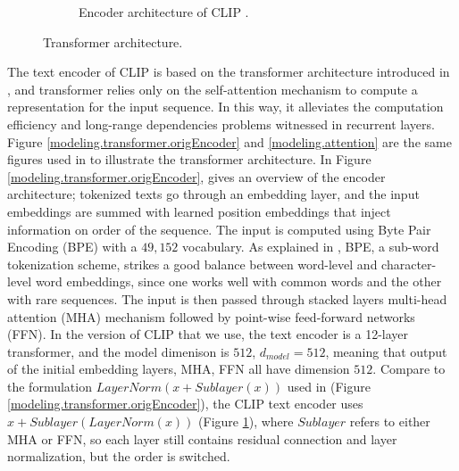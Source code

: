 \begin{figure}[!htb]
\begin{subfigure}{0.5\textwidth}
    \caption{Encoder architecture of CLIP \citep{CLIPpaper}.}
    \label{modeling.attention.clipEncoder}
\end{subfigure}
\caption{Transformer architecture.}
\label{modeling.transformer}
\end{figure}

The text encoder of CLIP is based on the transformer architecture introduced in \citet{attentionAllYouNeed}, and transformer relies only on the self-attention mechanism to compute a representation for the input sequence. In this way, it alleviates the computation efficiency and long-range dependencies problems witnessed in recurrent layers.  
Figure \ref{modeling.transformer.origEncoder} and \ref{modeling.attention} are the same figures used in \cite{attentionAllYouNeed} to illustrate the transformer architecture. In Figure \ref{modeling.transformer.origEncoder}, \cite{attentionAllYouNeed} gives an overview of the encoder architecture; tokenized texts go through an embedding layer, and the input embeddings are summed with learned position embeddings that inject information on order of the sequence. 
The input is computed using Byte Pair Encoding (BPE) with a $49,152$ vocabulary. As explained in \cite{Radford2019LanguageMA}, BPE, a sub-word tokenization scheme, strikes a good balance between word-level and character-level word embeddings, since one works well with common words and the other with rare sequences.
The input is then passed through stacked layers multi-head attention (MHA) mechanism followed by point-wise feed-forward networks (FFN). 
In the version of CLIP that we use, the text encoder is a 12-layer transformer, and the model dimenison is $512$, $d_{model} = 512$, meaning that output of the initial embedding layers, MHA, FFN all have dimension $512$.  
Compare to the formulation $LayerNorm(x + Sublayer(x))$ used in \cite{attentionAllYouNeed} (Figure \ref{modeling.transformer.origEncoder}), the CLIP text encoder uses $x + Sublayer(LayerNorm(x))$ (Figure \ref{modeling.attention.clipEncoder}), where $Sublayer$ refers to either MHA or FFN, so each layer still contains residual connection and layer normalization, but the order is switched. 


